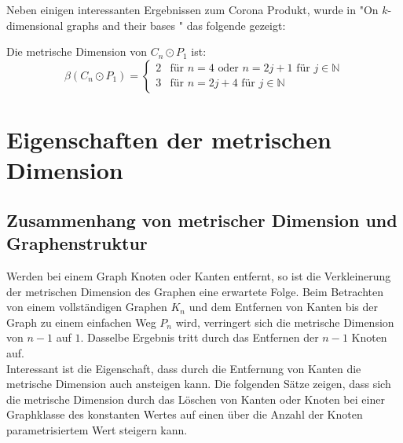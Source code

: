 Neben einigen interessanten Ergebnissen zum Corona Produkt, wurde in  "On $k$-dimensional graphs and their bases
" \cite{bases} das folgende gezeigt:
\begin{lem}Die metrische Dimension von $C_n \odot P_1$ ist:
\begin{equation}
  \beta(C_n \odot P_1)=
   \begin{cases}
     2 & \text{f\"ur } n = 4 \text{ oder } n = 2j+1 \text{ f\"ur } j \in \mathbb{N} \\
     3 & \text{f\"ur } n = 2j+4 \text{ f\"ur } j \in \mathbb{N} 
   \end{cases}
\end{equation}
\end{lem}
\chapter{Eigenschaften der metrischen Dimension}
\label{kapallg}
\section{Zusammenhang von metrischer Dimension und Graphenstruktur}
Werden bei einem Graph Knoten oder Kanten entfernt, so ist die Verkleinerung der metrischen Dimension des Graphen eine erwartete Folge. Beim Betrachten von einem vollständigen Graphen $K_n$ und dem Entfernen von Kanten bis der Graph zu einem einfachen Weg $P_n$ wird, verringert sich die metrische Dimension von $n-1$ auf $1$. Dasselbe Ergebnis tritt durch das Entfernen der $n-1$ Knoten auf.\\Interessant ist die Eigenschaft, dass durch die Entfernung von Kanten die metrische Dimension auch ansteigen kann. Die folgenden Sätze zeigen, dass sich die metrische Dimension durch das Löschen von Kanten oder Knoten bei einer Graphklasse des konstanten Wertes auf einen über die Anzahl der Knoten parametrisiertem Wert steigern kann.

